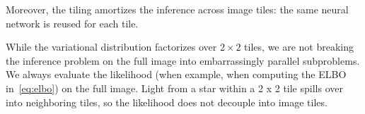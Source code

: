 Moreover, the tiling amortizes the inference across image tiles: the same neural network is reused for each tile. 

While the variational distribution factorizes over $2 \times 2$ tiles, we are not breaking the inference problem on the full image into embarrassingly parallel subproblems. We always evaluate the likelihood (when example, when computing the ELBO in~\eqref{eq:elbo}) on the full image. Light from a star within a 2 x 2 tile spills over into neighboring tiles, so the likelihood does not decouple into image tiles. 
